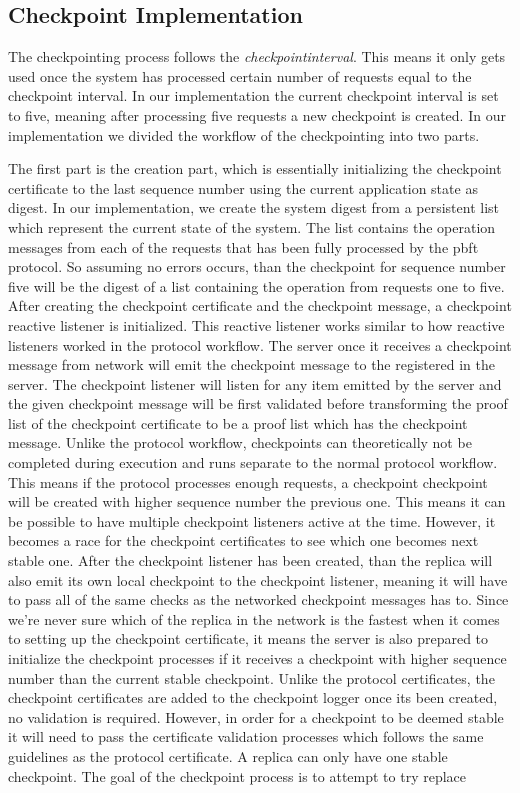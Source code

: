 \subsection{Checkpoint Implementation}
\label{section:ImpCheckpointing}
The checkpointing process follows the \emph{checkpointinterval}. This means it only gets used once the system has processed certain number of requests equal to the checkpoint interval. In our implementation the current checkpoint interval is set to five, meaning after processing five requests a new checkpoint is created. In our implementation we divided the workflow of the checkpointing into two parts. 

The first part is the creation part, which is essentially initializing the checkpoint certificate to the last sequence number using the current application state as digest. In our implementation, we create the system digest from a persistent list which represent the current state of the system. The list contains the operation messages from each of the requests that has been fully processed by the \ac{pbft} protocol. So assuming no errors occurs, than the checkpoint for sequence number five will be the digest of a list containing the operation from requests one to five. After creating the checkpoint certificate and the checkpoint message, a checkpoint reactive listener is initialized. This reactive listener works similar to how reactive listeners worked in the protocol workflow. The server once it receives a checkpoint message from network will emit the checkpoint message to the  registered in the server. The checkpoint listener will listen for any item emitted by the server and the given checkpoint message will be first validated before transforming the proof list of the checkpoint  certificate to be a proof list which has the checkpoint message. Unlike the protocol workflow, checkpoints can theoretically not be completed during execution and runs separate to the normal protocol workflow. This means if the protocol processes enough requests, a checkpoint checkpoint will be created with higher sequence number the previous one. This means it can be possible to have multiple checkpoint listeners active at the time. However, it becomes a race for the checkpoint certificates to see which one becomes next stable one. After the checkpoint listener has been created, than the replica will also emit its own local checkpoint to the checkpoint listener, meaning it will have to pass all of the same checks as the networked checkpoint messages has to. Since we're never sure which of the replica in the network is the fastest when it comes to setting up the checkpoint certificate, it means the server is also prepared to initialize the checkpoint processes if it receives a checkpoint with higher sequence number than the current stable checkpoint. Unlike the protocol certificates, the checkpoint certificates are added to the checkpoint logger once its been created, no validation is required. However, in order for a checkpoint to be deemed stable it will need to pass the certificate validation processes which follows the same guidelines as the protocol certificate. A replica can only have one stable checkpoint. The goal of the checkpoint process is to attempt to try replace 